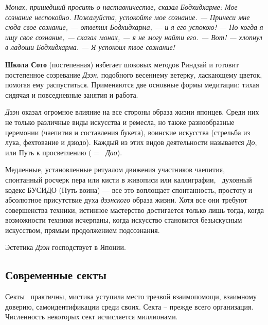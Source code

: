\documentclass[a4paper]{article}
\newcommand\textstyleiii[1]{\foreignlanguage{russian}{\textbf{#1}}}
\begin{document}
{\itshape
Монах, пришедший просить о наставничестве, сказал Бодхидхарме: {\textquotedbl}Мое сознание неспокойно. Пожалуйста,
успокойте мое сознание. — Принеси мне сюда свое сознание, — ответил Бодхидхарма, — и я его успокою! — Но когда я ищу
свое сознание, — сказал монах, — я не могу найти его. — Вот! — хлопнул в ладоши Бодхидхарма. — Я успокоил твое
сознание! {\textquotedbl}}

{
\textbf{Школа Сото} (постепенная) избегает шоковых методов Риндзай и готовит постепенное созревание \textit{Дзэн},
{\textquotedbl}подобного весеннему ветерку, ласкающему цветок, помогая ему распуститься{\textquotedbl}. Применяются две
основные формы медитации: {\textquotedbl}тихая сидячая{\textquotedbl} и повседневные занятия и работа. }

{
\textit{Дзэн} оказал огромное влияние на все стороны образа жизни японцев. Среди них не только различные виды искусства
и ремесла, но также разнообразные церемонии (чаепития и составления букета), воинские искусства (стрельба из лука,
фехтование и дзюдо). Каждый из этих видов деятельности называется \textit{До}, или Путь к просветлению ( =
\ \textit{Дао}). }

{
Медленные, установленные ритуалом движения участников чаепития, спонтанный росчерк пера или кисти в живописи или
каллиграфии, \ духовный кодекс БУСИДО ({\textquotedbl}Путь воина{\textquotedbl}) — все это воплощает спонтанность,
простоту и абсолютное присутствие духа \textit{дзэнского} образа жизни. Хотя все они требуют совершенства техники,
истинное мастерство достигается только лишь тогда, когда возможности техники исчерпаны, когда искусство становится
{\textquotedbl}безыскусным искусством{\textquotedbl}, прямым продолжением подсознания.}

{
Эстетика \textit{Дзэн} господствует в Японии.}

\subsection[\textcyrillic{С}\textcyrillic{о}\textcyrillic{в}\textcyrillic{р}\textcyrillic{е}\textcyrillic{м}\textcyrillic{е}\textcyrillic{н}\textcyrillic{н}\textcyrillic{ы}\textcyrillic{е}
\textcyrillic{с}\textcyrillic{е}\textcyrillic{к}\textcyrillic{т}\textcyrillic{ы}]{\textstyleiii{Современные}\foreignlanguage{russian}{
}\textstyleiii{секты}}
{
Секты \ практичны, мистика уступила место трезвой взаимопомощи, взаимному доверию, самоидентификации среди
{\textquotedbl}своих{\textquotedbl}. Секта – прежде всего организация. Численность некоторых сект исчисляется
миллионами.}
\end{document}
